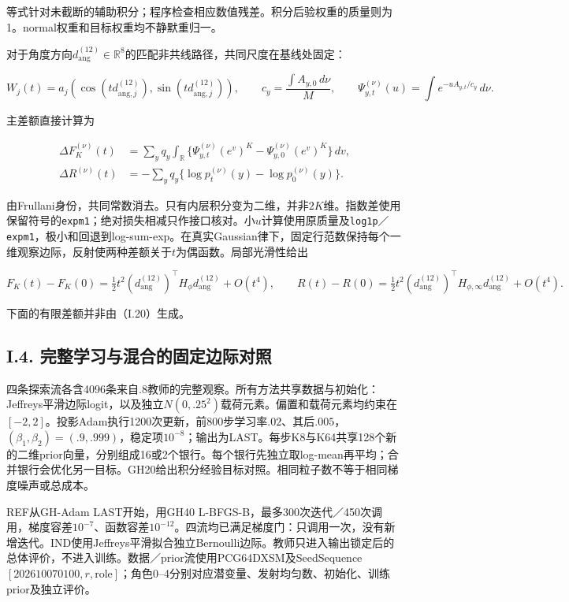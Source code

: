 \documentclass[11pt,a4paper]{article}
\begin{document}
等式针对未截断的辅助积分；程序检查相应数值残差。积分后验权重的质量则为1。normal权重和目标权重均不静默重归一。

对于角度方向\(d_{\mathrm{ang}}^{(12)}\in\mathbb R^8\)的匹配非共线路径，共同尺度在基线处固定：

\[
W_j(t)=a_j(\cos(td_{\mathrm{ang},j}^{(12)}),\sin(td_{\mathrm{ang},j}^{(12)})),\qquad
c_y=\frac{\int A_{y,0}\,d\nu}{M},\qquad
\Psi_{y,t}^{(\nu)}(u)=\int e^{-uA_{y,t}/c_y}\,d\nu.
\tag{I.18}
\]

主差额直接计算为

\[
\begin{aligned}
\Delta F_K^{(\nu)}(t)&=\sum_yq_y\int_{\mathbb R}
\{\Psi_{y,t}^{(\nu)}(e^v)^K-\Psi_{y,0}^{(\nu)}(e^v)^K\}\,dv,\\
\Delta R^{(\nu)}(t)&=-\sum_yq_y\{\log p_t^{(\nu)}(y)-\log p_0^{(\nu)}(y)\}.
\end{aligned}
\tag{I.19}
\]

由Frullani身份，共同常数消去。只有内层积分变为二维，并非\(2K\)维。指数差使用保留符号的\texttt{expm1}；绝对损失相减只作接口核对。小\(u\)计算使用原质量及\texttt{log1p}／\texttt{expm1}，极小和回退到log-sum-exp。在真实Gaussian律下，固定行范数保持每个一维观察边际，反射使两种差额关于\(t\)为偶函数。局部光滑性给出

\[
F_K(t)-F_K(0)=\tfrac12t^2(d_{\mathrm{ang}}^{(12)})^\top H_\phi d_{\mathrm{ang}}^{(12)}+O(t^4),\qquad
R(t)-R(0)=\tfrac12t^2(d_{\mathrm{ang}}^{(12)})^\top H_{\phi,\infty}d_{\mathrm{ang}}^{(12)}+O(t^4).
\tag{I.20}
\]

下面的有限差额并非由（I.20）生成。

\subsection*{I.4.
完整学习与混合的固定边际对照}\label{i.4.-ux5b8cux6574ux5b66ux4e60ux4e0eux6df7ux5408ux7684ux56faux5b9aux8fb9ux9645ux5bf9ux7167}

四条探索流各含4096条来自\(.8\)教师的完整观察。所有方法共享数据与初始化：Jeffreys平滑边际logit，以及独立\(N(0,.25^2)\)载荷元素。偏置和载荷元素均约束在\([-2,2]\)。投影Adam执行1200次更新，前800步学习率\(.02\)、其后\(.005\)，\((\beta_1,\beta_2)=(.9,.999)\)，稳定项\(10^{-8}\)；输出为LAST。每步K8与K64共享128个新的二维prior向量，分别组成16或2个银行。每个银行先独立取log-mean再平均；合并银行会优化另一目标。GH20给出积分经验目标对照。相同粒子数不等于相同梯度噪声或总成本。

REF从GH-Adam LAST开始，用GH40
L-BFGS-B，最多300次迭代／450次调用，梯度容差\(10^{-7}\)、函数容差\(10^{-12}\)。四流均已满足梯度门：只调用一次，没有新增迭代。IND使用Jeffreys平滑拟合独立Bernoulli边际。教师只进入输出锁定后的总体评价，不进入训练。数据／prior流使用PCG64DXSM及SeedSequence
\([202610070100,r,\mathrm{role}]\)；角色0--4分别对应潜变量、发射均匀数、初始化、训练prior及独立评价。
\end{document}
